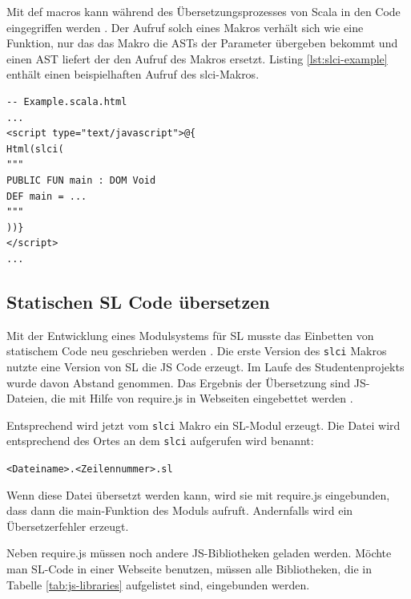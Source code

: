 \documentclass[12pt]{scrreprt}
\begin{document}
Mit def macros kann während des Übersetzungsprozesses von Scala in den Code eingegriffen werden \cite{EPFL2}. Der Aufruf solch eines Makros verhält sich wie eine Funktion, nur das das Makro die \ac{AST}s der Parameter übergeben bekommt und einen \ac{AST} liefert der den Aufruf des Makros ersetzt. Listing \ref{lst:slci-example} enthält einen beispielhaften Aufruf des slci-Makros.

\begin{lstlisting}[caption={Beispielaufruf des slci-Makros in einer Play View}, label=lst:slci-example, float=h]
-- Example.scala.html
...
<script type="text/javascript">@{
Html(slci(
"""
PUBLIC FUN main : DOM Void
DEF main = ...
"""
))}
</script>
...
\end{lstlisting}

\subsection{Statischen SL Code übersetzen}
\label{subsec:compile-static-sl}

Mit der Entwicklung eines Modulsystems für \ac{SL} musste das Einbetten von statischem Code neu geschrieben werden \cite{Bisping2013}. Die erste Version des \lstinline!slci! Makros nutzte eine Version von \ac{SL} die \ac{JS} Code erzeugt. Im Laufe des Studentenprojekts wurde davon Abstand genommen. Das Ergebnis der Übersetzung sind \ac{JS}-Dateien, die mit Hilfe von require.js in Webseiten eingebettet werden \cite{RequireJS1}.

Entsprechend wird jetzt vom \lstinline!slci! Makro ein \ac{SL}-Modul erzeugt. Die Datei wird entsprechend des Ortes an dem \lstinline!slci! aufgerufen wird benannt:
\begin{center}
\lstinline!<Dateiname>.<Zeilennummer>.sl!
\end{center}
Wenn diese Datei übersetzt werden kann, wird sie mit require.js eingebunden, dass dann die main-Funktion des Moduls aufruft. Andernfalls wird ein Übersetzerfehler erzeugt. 

Neben require.js müssen noch andere \ac{JS}-Bibliotheken geladen werden. Möchte man \ac{SL}-Code in einer Webseite benutzen, müssen alle Bibliotheken, die in Tabelle \ref{tab:js-libraries} aufgelistet sind, eingebunden werden.
\end{document}
